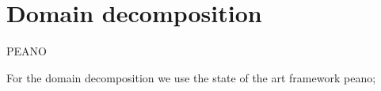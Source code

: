 \section{Domain decomposition}
\label{section:domain-decomposition}

PEANO

For the domain decomposition we use the state of the art framework peano; 